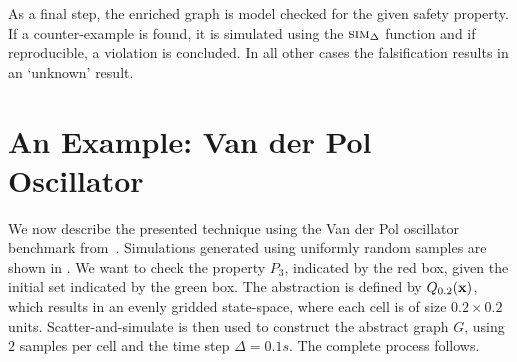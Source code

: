 
As a final step, the enriched graph is model checked for the given
safety property. If a counter-example is found, it is simulated using
the $\mbox{\sc sim}_\Delta$ function and if reproducible, a violation is
concluded. In all other cases the falsification results in an
`unknown' result.


\section{An Example: Van der Pol Oscillator}

We now describe the presented technique using the Van der Pol
oscillator benchmark from~\cite{zutshi2014multiple}. Simulations
generated using uniformly random samples are shown in
. We want to check the property $P_3$, indicated by
the red box, given the initial set indicated by the green box. The
abstraction is defined by $Q_{0.2}(\mathbf{x})$, which results in an
evenly gridded state-space, where each cell is of size $0.2 \times
0.2$ units.  Scatter-and-simulate is then used to construct the
abstract graph $G$, using $2$ samples per cell and the time step
$\Delta = 0.1s$. The complete process follows.

